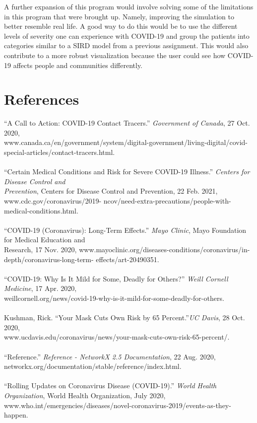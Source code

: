 \documentclass[fontsize=11pt]{article}
\begin{document}
A further expansion of this program would involve solving some of the limitations in this program that were brought up. Namely, improving the simulation to better resemble real life. A good way to do this would be to use the different levels of severity one can experience with COVID-19 and group the patients into categories similar to a SIRD model from a previous assignment. This would also contribute to a more robust visualization because the user could see how COVID-19 affects people and communities differently.
\newpage
\section*{References}
“A Call to Action: COVID-19 Contact Tracers.” \textit{Government of Canada}, 27 Oct. 2020,\\
\indent www.canada.ca/en/government/system/digital-government/living-digital/covid-special-articles/contact-tracers.html.
\\ \\
“Certain Medical Conditions and Risk for Severe COVID-19 Illness.” \textit{Centers for Disease Control and}  \\
\indent \textit{Prevention}, Centers for Disease Control and Prevention, 22 Feb. 2021, www.cdc.gov/coronavirus/2019-
ncov/need-\indent extra-precautions/people-with-medical-conditions.html. \\ \\
“COVID-19 (Coronavirus): Long-Term Effects.” \textit{Mayo Clinic}, Mayo Foundation for Medical Education and \\
\indent Research, 17 Nov. 2020, www.mayoclinic.org/diseases-conditions/coronavirus/in-depth/coronavirus-long-term-
\indent effects/art-20490351.
\\ \\
“COVID-19: Why Is It Mild for Some, Deadly for Others?” \textit{Weill Cornell Medicine}, 17 Apr. 2020, \\
\indent weillcornell.org/news/covid-19-why-is-it-mild-for-some-deadly-for-others.
\\ \\
Kushman, Rick. “Your Mask Cuts Own Risk by 65 Percent.”\textit{UC Davis}, 28 Oct. 2020, \\
\indent www.ucdavis.edu/coronavirus/news/your-mask-cuts-own-risk-65-percent/.
\\ \\
“Reference.” \textit{Reference - NetworkX 2.5 Documentation}, 22 Aug. 2020, \\
\indent networkx.org/documentation/stable/reference/index.html.
\\ \\
“Rolling Updates on Coronavirus Disease (COVID-19).” \textit{World Health Organization}, World Health Organization,
 July 2020, www.who.int/emergencies/diseases/novel-coronavirus-2019/events-as-they-happen.
\end{document}
